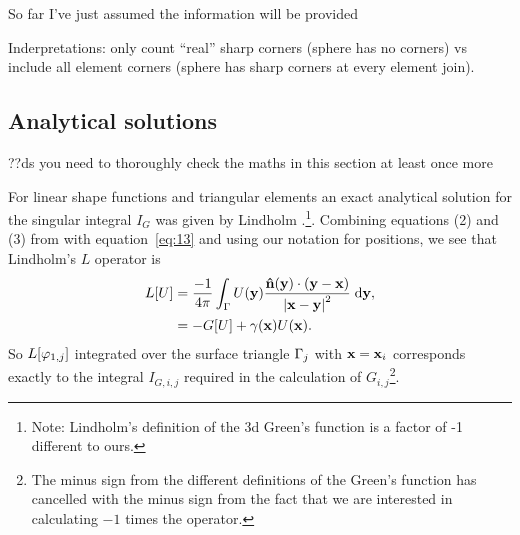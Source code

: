So far I've just assumed the information will be provided

Inderpretations: only count ``real'' sharp corners (\ie sphere has no corners) vs include all element corners (\ie sphere has sharp corners at every element join).


\subsection{Analytical solutions}

??ds you need to thoroughly check the maths in this section at least once more

For linear shape functions and triangular elements an exact analytical solution for the singular integral $I_G$ was given by Lindholm \cite[App. B]{Lindholm1984}.\footnote{Note: Lindholm's definition of the 3d Green's function is a factor of -1 different to ours.}. 
Combining equations (2) and (3) from \cite{Lindholm1984} with equation~\eqref{eq:13} and using our notation for positions, we see that Lindholm's $L$ operator is
\begin{equation}
  \begin{aligned}
    L[U] &= \frac{-1}{4 \pi}\int_{\Gamma} U(\mathbf{y}) \frac{\mathbf{\hat{n}}(\mathbf{y}) \cdot (\mathbf{y} -
      \mathbf{x})}{\left|{\mathbf{x} - \mathbf{y}} \right|^2}
    {\; \text{d}}\mathbf{y}, \\
    &= -G[U] + \gamma(\mathbf{x}) U(\mathbf{x}).
  \end{aligned}
\end{equation}
So $L[\varphi_{1,{j}}]$ integrated over the surface triangle ${\Gamma}_{j}$ with $\mathbf{x} = \mathbf{x}_{i}$ corresponds exactly to the integral $I_{G,i,j}$ required in the calculation of $G_{i,j}$\footnote{The minus sign from the different definitions of the Green's function has cancelled with the minus sign from the fact that we are interested in calculating $-1$ times the operator.}.

